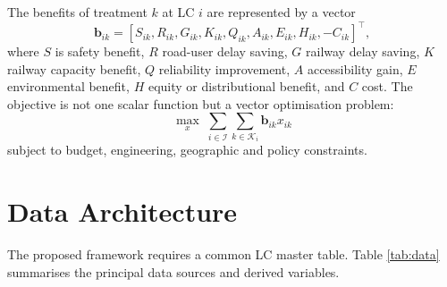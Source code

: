\documentclass[11pt,a4paper]{article}
\begin{document}
The benefits of treatment $k$ at LC $i$ are represented by a vector
\begin{equation}
\mathbf{b}_{ik}=\left[
S_{ik},R_{ik},G_{ik},K_{ik},Q_{ik},A_{ik},E_{ik},H_{ik},-C_{ik}
\right]^\top,
\end{equation}
where $S$ is safety benefit, $R$ road-user delay saving, $G$ railway delay saving, $K$ railway capacity benefit, $Q$ reliability improvement, $A$ accessibility gain, $E$ environmental benefit, $H$ equity or distributional benefit, and $C$ cost. The objective is not one scalar function but a vector optimisation problem:
\begin{equation}
\max_{x}\; \sum_{i\in\mathcal{I}}\sum_{k\in\mathcal{K}_i}\mathbf{b}_{ik}x_{ik}
\end{equation}
subject to budget, engineering, geographic and policy constraints.

\section{Data Architecture}

The proposed framework requires a common LC master table. Table \ref{tab:data} summarises the principal data sources and derived variables.
\end{document}
